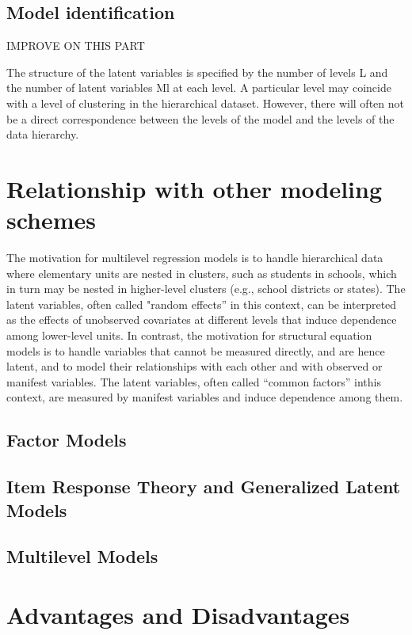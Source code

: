 \subsection{Model identification}
{\color{red} IMPROVE ON THIS PART
	
	The structure of the latent variables is specified by the number of levels L and the number
	of latent variables Ml at each level. A particular level may coincide with a level of clustering in the hierarchical dataset. However, there will often not be a direct correspondence between the levels of the model and the levels of the data hierarchy.
}


\section{Relationship with other modeling schemes}

\citet{Rabe_et_al_2012}

{\color{red} The motivation for multilevel regression models is to handle hierarchical data where elementary units are nested in clusters, such as students in schools, which in
turn may be nested in higher-level clusters (e.g., school districts or states). The latent variables, often called "random effects” in this context, can be interpreted as
the effects of unobserved covariates at different levels that induce dependence among lower-level units. In contrast, the motivation for structural equation models is to
handle variables that cannot be measured directly, and are hence latent, and to model their relationships with each other and with observed or manifest variables.
The latent variables, often called “common factors” inthis context, are measured by manifest variables and induce dependence among them.}


\subsection{Factor Models}

\subsection{Item Response Theory and Generalized Latent Models}

\subsection{Multilevel Models}



\section{Advantages and Disadvantages}